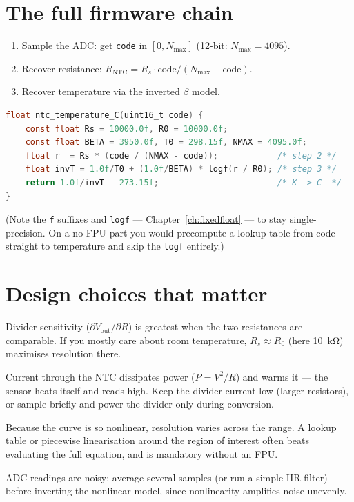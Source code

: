 \documentclass[11pt,a4paper,oneside]{book}
\newcommand{\code}[1]{\texttt{#1}}
\begin{document}
\section{The full firmware chain}
\begin{enumerate}[leftmargin=1.4cm]
  \item Sample the ADC: get \code{code} in $[0, N_{\max}]$ (12-bit:
        $N_{\max}=4095$).
  \item Recover resistance: $R_{\text{NTC}} = R_s\cdot\text{code}/(N_{\max}-\text{code})$.
  \item Recover temperature via the inverted $\beta$ model.
\end{enumerate}
\begin{lstlisting}[language=C,caption={NTC code-to-temperature (ratiometric).}]
float ntc_temperature_C(uint16_t code) {
    const float Rs = 10000.0f, R0 = 10000.0f;
    const float BETA = 3950.0f, T0 = 298.15f, NMAX = 4095.0f;
    float r  = Rs * (code / (NMAX - code));            /* step 2 */
    float invT = 1.0f/T0 + (1.0f/BETA) * logf(r / R0); /* step 3 */
    return 1.0f/invT - 273.15f;                        /* K -> C  */
}
\end{lstlisting}
(Note the \code{f} suffixes and \code{logf} --- Chapter~\ref{ch:fixedfloat} ---
to stay single-precision. On a no-FPU part you would precompute a lookup table
from code straight to temperature and skip the \code{logf} entirely.)

\section{Design choices that matter}
\begin{description}[leftmargin=0.4cm,style=nextline]
  \item[Pick $R_s$ near $R_{\text{NTC}}$ at your target temperature.] Divider
        sensitivity ($\partial V_{\text{out}}/\partial R$) is greatest when the
        two resistances are comparable. If you mostly care about room
        temperature, $R_s \approx R_0$ (here \qty{10}{\kilo\ohm}) maximises
        resolution there.
  \item[Mind self-heating.] Current through the NTC dissipates power
        ($P=V^2/R$) and warms it --- the sensor heats itself and reads high.
        Keep the divider current low (larger resistors), or sample briefly and
        power the divider only during conversion.
  \item[Linearise where it counts.] Because the curve is so nonlinear,
        resolution varies across the range. A lookup table or piecewise
        linearisation around the region of interest often beats evaluating the
        full equation, and is mandatory without an FPU.
  \item[Filter.] ADC readings are noisy; average several samples (or run a
        simple IIR filter) before inverting the nonlinear model, since
        nonlinearity amplifies noise unevenly.
\end{description}
\end{document}

